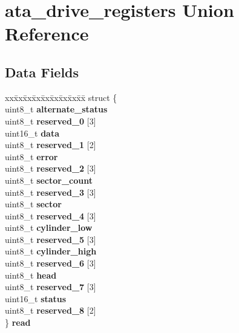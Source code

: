 \hypertarget{unionata__drive__registers}{}\section{ata\+\_\+drive\+\_\+registers Union Reference}
\label{unionata__drive__registers}
\subsection*{Data Fields}
\begin{DoxyCompactItemize}
\item 
\mbox{\label{unionata__drive__registers_a1e52610d2d5f403fcd037494b7397136}} 
\begin{tabbing}
xx\=xx\=xx\=xx\=xx\=xx\=xx\=xx\=xx\=\kill
struct \{\\
\>uint8\_t {\bfseries alternate\_status}\\
\>uint8\_t {\bfseries reserved\_0} \mbox{[}3\mbox{]}\\
\>uint16\_t {\bfseries data}\\
\>uint8\_t {\bfseries reserved\_1} \mbox{[}2\mbox{]}\\
\>uint8\_t {\bfseries error}\\
\>uint8\_t {\bfseries reserved\_2} \mbox{[}3\mbox{]}\\
\>uint8\_t {\bfseries sector\_count}\\
\>uint8\_t {\bfseries reserved\_3} \mbox{[}3\mbox{]}\\
\>uint8\_t {\bfseries sector}\\
\>uint8\_t {\bfseries reserved\_4} \mbox{[}3\mbox{]}\\
\>uint8\_t {\bfseries cylinder\_low}\\
\>uint8\_t {\bfseries reserved\_5} \mbox{[}3\mbox{]}\\
\>uint8\_t {\bfseries cylinder\_high}\\
\>uint8\_t {\bfseries reserved\_6} \mbox{[}3\mbox{]}\\
\>uint8\_t {\bfseries head}\\
\>uint8\_t {\bfseries reserved\_7} \mbox{[}3\mbox{]}\\
\>uint16\_t {\bfseries status}\\
\>uint8\_t {\bfseries reserved\_8} \mbox{[}2\mbox{]}\\
\} {\bfseries read}\\


\end{tabbing}
\end{DoxyCompactItemize}

